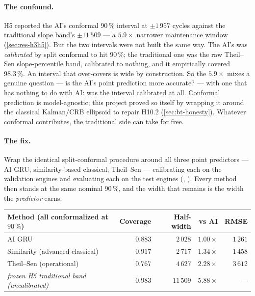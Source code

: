 \paragraph{The confound.} H5 reported the AI's conformal $90\,\%$ interval at
$\pm1\,957$ cycles against the traditional slope band's $\pm11\,509$ --- a
$5.9\times$ narrower maintenance window (\cref{sec:res-h3h5}). But the two intervals were not
built the same way. The AI's was \emph{calibrated} by split conformal to hit $90\,\%$; the
traditional one was the raw Theil--Sen slope-percentile band, calibrated to nothing, and it
empirically covered $98.3\,\%$. An interval that over-covers is wide by construction. So the
$5.9\times$ mixes a genuine question --- is the AI's point prediction more accurate? --- with
one that has nothing to do with AI: was the interval calibrated at all. Conformal prediction
is model-agnostic; this project proved so itself by wrapping it around the classical
Kalman/CRB ellipsoid to repair H10.2 (\cref{sec:bt-honesty}). Whatever conformal contributes,
the traditional side can take for free.

\paragraph{The fix.} Wrap the identical split-conformal procedure around all three point
predictors --- AI GRU, similarity-based classical, Theil--Sen --- calibrating each on the
validation engines and evaluating each on the test engines
(, ). Every method then stands at the
same nominal $90\,\%$, and the width that remains is the width the \emph{predictor} earns.

\begin{center}\small
\begin{tabular}{@{}lrrrr@{}}
  \toprule
  Method (all conformalized at $90\,\%$) & Coverage & Half-width & vs AI & RMSE \\
  \midrule
  AI GRU                             & $0.883$ & $2\,028$ & $1.00\times$ & $1\,261$ \\
  Similarity (advanced classical)    & $0.917$ & $2\,717$ & $1.34\times$ & $1\,458$ \\
  Theil--Sen (operational)           & $0.767$ & $4\,627$ & $2.28\times$ & $3\,612$ \\
  \midrule
  \emph{frozen H5 traditional band (uncalibrated)} & $0.983$ & $11\,509$ & $5.88\times$ & --- \\
  \bottomrule
\end{tabular}
\end{center}

